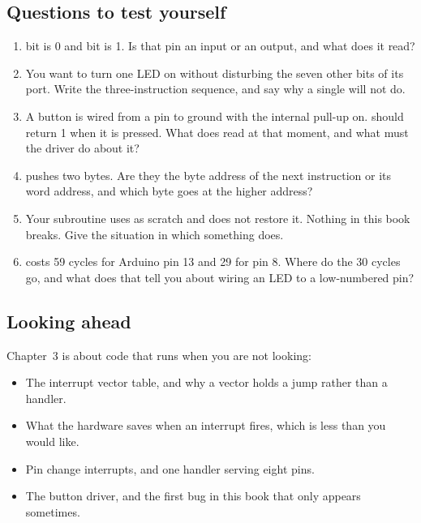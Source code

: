 \subsection*{Questions to test yourself}
\begin{enumerate}
  \item {} bit is 0 and  bit is 1. Is that pin an input or an output, and
    what does it read?
  \item You want to turn one LED on without disturbing the seven other bits of its port. Write the
    three-instruction sequence, and say why a single  will not do.
  \item A button is wired from a pin to ground with the internal pull-up on. 
    should return 1 when it is pressed. What does  read at that moment, and what must
    the driver do about it?
  \item {} pushes two bytes. Are they the byte address of the next instruction or its
    word address, and which byte goes at the higher address?
  \item Your subroutine uses  as scratch and does not restore it. Nothing in this book
    breaks. Give the situation in which something does.
  \item {} costs 59 cycles for Arduino pin 13 and 29 for pin 8. Where do the 30 cycles
    go, and what does that tell you about wiring an LED to a low-numbered pin?
\end{enumerate}

\subsection*{Looking ahead}
Chapter~3 is about code that runs when you are not looking:
\begin{itemize}
  \item The interrupt vector table, and why a vector holds a jump rather than a handler.
  \item What the hardware saves when an interrupt fires, which is less than you would like.
  \item Pin change interrupts, and one handler serving eight pins.
  \item The button driver, and the first bug in this book that only appears sometimes.
\end{itemize}
